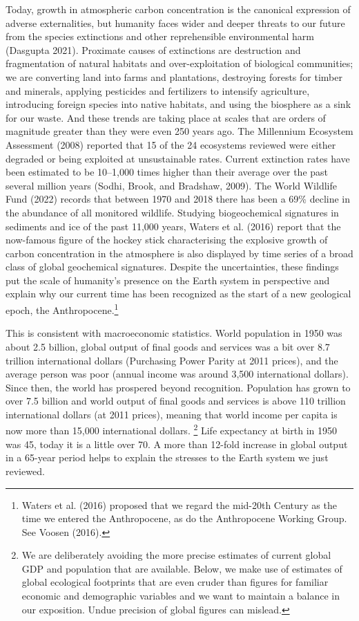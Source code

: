 \documentclass[man,11pt,a4paper,floatsintext]{apa7}
\begin{document}
Today, growth in atmospheric carbon concentration is the canonical expression of adverse externalities, but humanity faces wider and deeper threats to our future from the species extinctions and other reprehensible environmental harm (Dasgupta 2021). Proximate causes of extinctions are destruction and fragmentation of natural habitats and over-exploitation of biological communities; we are converting land into farms and plantations, destroying forests for timber and minerals, applying pesticides and fertilizers to intensify agriculture, introducing foreign species into native habitats, and using the biosphere as a sink for our waste. And these trends are taking place at scales that are orders of magnitude greater than they were even 250 years ago. The Millennium Ecosystem Assessment (2008) reported that 15 of the 24 ecosystems reviewed were either degraded or being exploited at unsustainable rates. Current extinction rates have been estimated to be 10--1,000 times higher than their average over the past several million years (Sodhi, Brook, and Bradshaw, 2009). The World Wildlife Fund (2022) records that between 1970 and 2018 there has been a 69\% decline in the abundance of all monitored wildlife. Studying biogeochemical signatures in sediments and ice of the past 11,000 years, Waters et al. (2016) report that the now-famous figure of the hockey stick characterising the explosive growth of carbon concentration in the atmosphere is also displayed by time series of a broad class of global geochemical signatures. Despite the uncertainties, these findings put the scale of humanity's presence on the Earth system in perspective and explain why our current time has been recognized as the start of a new geological epoch, the Anthropocene.\footnote{Waters et al. (2016) proposed that we regard the mid-20th Century as the time we entered the Anthropocene, as do the Anthropocene Working Group. See Voosen (2016).}

This is consistent with macroeconomic statistics. World population in 1950 was about 2.5 billion, global output of final goods and services was a bit over 8.7 trillion international dollars (Purchasing Power Parity at 2011 prices), and the average person was poor (annual income was around 3,500 international dollars). Since then, the world has prospered beyond recognition. Population has grown to over 7.5 billion and world output of final goods and services is above 110 trillion international dollars (at 2011 prices), meaning that world income per capita is now more than 15,000 international dollars. \footnote{We are deliberately avoiding the more precise estimates of current global GDP and population that are available. Below, we make use of estimates of global ecological footprints that are even cruder than figures for familiar economic and demographic variables and we want to maintain a balance in our exposition. Undue precision of global figures can mislead.} Life expectancy at birth in 1950 was 45, today it is a little over 70. A more than 12-fold increase in global output in a 65-year period helps to explain the stresses to the Earth system we just reviewed.
\end{document}
